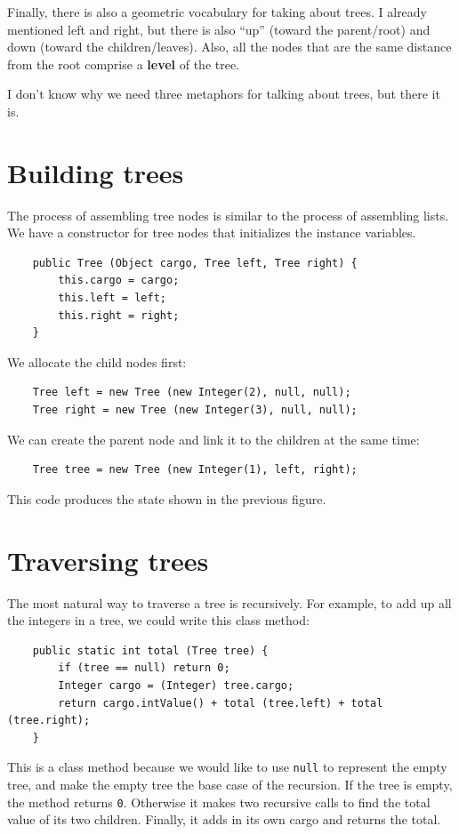 \documentclass[12pt]{book}
\theoremstyle{exercise}
\begin{document}
Finally, there is also a geometric vocabulary for taking
about trees.  I already mentioned left and right, but there is
also ``up'' (toward the parent/root) and down (toward the
children/leaves).  Also, all the nodes that are the same
distance from the root comprise a {\bf level} of the tree.

I don't know why we need three metaphors for talking about trees,
but there it is.


\section {Building trees}

The process of assembling tree nodes is similar
to the process of assembling lists.
We have a constructor for tree nodes that initializes the instance
variables.

\begin{verbatim}
    public Tree (Object cargo, Tree left, Tree right) {
        this.cargo = cargo;
        this.left = left;
        this.right = right;
    }
\end{verbatim}
%
We allocate the child nodes first:

\begin{verbatim}
    Tree left = new Tree (new Integer(2), null, null);
    Tree right = new Tree (new Integer(3), null, null);
\end{verbatim}
%
We can create the parent node and link it to the children
at the same time:

\begin{verbatim}
    Tree tree = new Tree (new Integer(1), left, right);
\end{verbatim}
%
This code produces the state shown in the previous figure.


\section {Traversing trees}

The most natural
way to traverse a tree is recursively.  For example, to
add up all the integers in a tree, we could write this class
method:

\begin{verbatim}
    public static int total (Tree tree) {
        if (tree == null) return 0;
        Integer cargo = (Integer) tree.cargo;
        return cargo.intValue() + total (tree.left) + total (tree.right);
    }
\end{verbatim}
%
This is a class method because we would like to use {\tt null} to
represent the empty tree, and make the empty tree the base case of the
recursion.  If the tree is empty, the method returns {\tt 0}.
Otherwise it makes two recursive calls to find the total value of its
two children.  Finally, it adds in its own cargo and returns the
total.
\end{document}
